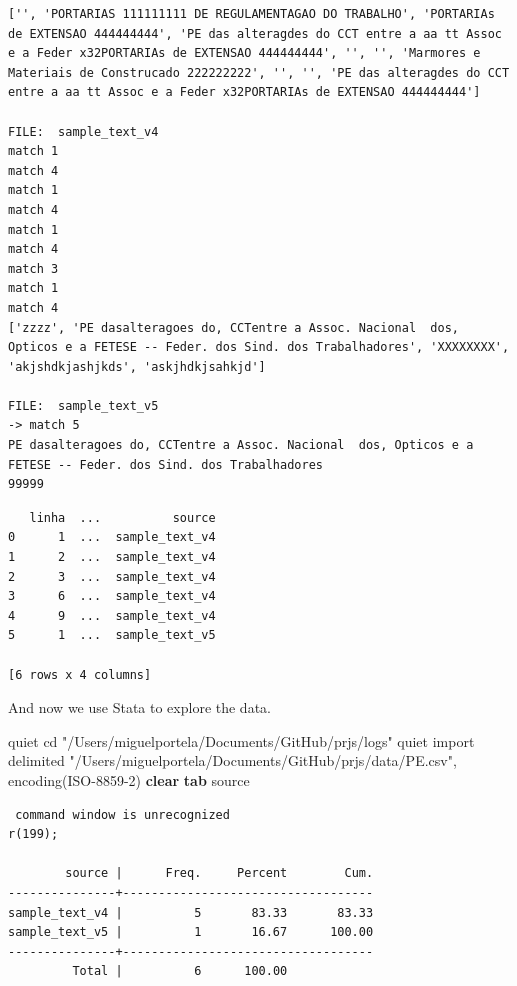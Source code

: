 \documentclass[
  12pt,
]{article}
\newenvironment{Shaded}{\begin{snugshade}}{\end{snugshade}}
\newcommand{\KeywordTok}[1]{\textcolor[rgb]{0.13,0.29,0.53}{\textbf{#1}}}
\newcommand{\NormalTok}[1]{#1}
\newcommand{\StringTok}[1]{\textcolor[rgb]{0.31,0.60,0.02}{#1}}
\begin{document}
\begin{verbatim}
['', 'PORTARIAS 111111111 DE REGULAMENTAGAO DO TRABALHO', 'PORTARIAs de EXTENSAO 444444444', 'PE das alteragdes do CCT entre a aa tt Assoc e a Feder x32PORTARIAs de EXTENSAO 444444444', '', '', 'Marmores e Materiais de Construcado 222222222', '', '', 'PE das alteragdes do CCT entre a aa tt Assoc e a Feder x32PORTARIAs de EXTENSAO 444444444']
   
FILE:  sample_text_v4
match 1
match 4
match 1
match 4
match 1
match 4
match 3
match 1
match 4
['zzzz', 'PE dasalteragoes do, CCTentre a Assoc. Nacional  dos, Opticos e a FETESE -- Feder. dos Sind. dos Trabalhadores', 'XXXXXXXX', 'akjshdkjashjkds', 'askjhdkjsahkjd']
   
FILE:  sample_text_v5
-> match 5
PE dasalteragoes do, CCTentre a Assoc. Nacional  dos, Opticos e a FETESE -- Feder. dos Sind. dos Trabalhadores
99999
\end{verbatim}

\begin{verbatim}
   linha  ...          source
0      1  ...  sample_text_v4
1      2  ...  sample_text_v4
2      3  ...  sample_text_v4
3      6  ...  sample_text_v4
4      9  ...  sample_text_v4
5      1  ...  sample_text_v5

[6 rows x 4 columns]
\end{verbatim}

And now we use Stata to explore the data.

\begin{Shaded}
\begin{Highlighting}[]

\NormalTok{quiet cd }\StringTok{"/Users/miguelportela/Documents/GitHub/prjs/logs"}
\NormalTok{quiet import delimited }\StringTok{"/Users/miguelportela/Documents/GitHub/prjs/data/PE.csv"}\NormalTok{, encoding(ISO-8859-2) }\KeywordTok{clear} 
\KeywordTok{tab}\NormalTok{ source}
\end{Highlighting}
\end{Shaded}

\begin{verbatim}
 command window is unrecognized
r(199);

        source |      Freq.     Percent        Cum.
---------------+-----------------------------------
sample_text_v4 |          5       83.33       83.33
sample_text_v5 |          1       16.67      100.00
---------------+-----------------------------------
         Total |          6      100.00
\end{verbatim}
\end{document}
